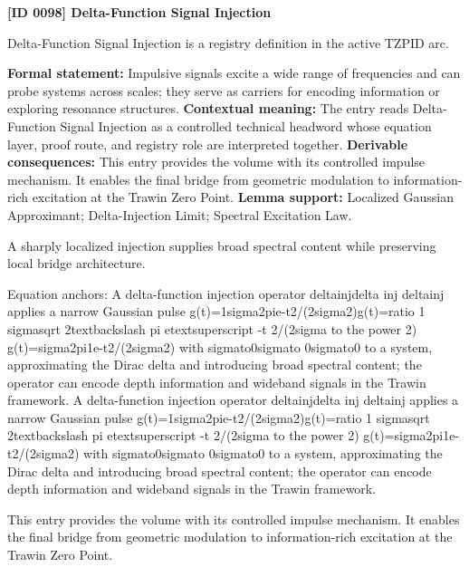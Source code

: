 \clearpage
\noindent\textbf{[ID 0098] Delta-Function Signal Injection}\par
\vspace{0.35em}
\begingroup\small
{}
Delta-Function Signal Injection is a registry definition in the active TZPID arc.

\begingroup\footnotesize\setlength{\emergencystretch}{3em}\sloppy
\textbf{Formal statement:} Impulsive signals excite a wide range of frequencies and can probe systems across scales; they serve as carriers for encoding information or exploring resonance structures. \textbf{Contextual meaning:} The entry reads Delta-Function Signal Injection as a controlled technical headword whose equation layer, proof route, and registry role are interpreted together. \textbf{Derivable consequences:} This entry provides the volume with its controlled impulse mechanism. It enables the final bridge from geometric modulation to information-rich excitation at the Trawin Zero Point. \textbf{Lemma support:} Localized Gaussian Approximant; Delta-Injection Limit; Spectral Excitation Law.\par
\endgroup

A sharply localized injection supplies broad spectral content while preserving local bridge architecture.

Equation anchors: A delta-function injection operator deltainjdelta inj deltainj applies a narrow Gaussian pulse g(t)=1sigma2pie-t2/(2sigma2)g(t)=ratio 1 sigmasqrt 2textbackslash pi etextsuperscript -t 2/(2sigma to the power 2) g(t)=sigma2pi1e-t2/(2sigma2) with sigmato0sigmato 0sigmato0 to a system, approximating the Dirac delta and introducing broad spectral content; the operator can encode depth information and wideband signals in the Trawin framework. A delta-function injection operator deltainjdelta inj deltainj applies a narrow Gaussian pulse g(t)=1sigma2pie-t2/(2sigma2)g(t)=ratio 1 sigmasqrt 2textbackslash pi etextsuperscript -t 2/(2sigma to the power 2) g(t)=sigma2pi1e-t2/(2sigma2) with sigmato0sigmato 0sigmato0 to a system, approximating the Dirac delta and introducing broad spectral content; the operator can encode depth information and wideband signals in the Trawin framework.

This entry provides the volume with its controlled impulse mechanism. It enables the final bridge from geometric modulation to information-rich excitation at the Trawin Zero Point.
\endgroup

